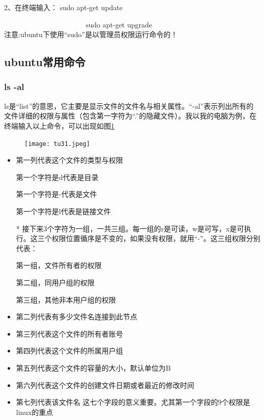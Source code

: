 \documentclass[12pt]{article}
\begin{document}
 2、在终端输入： sudo apt-get update

~~~~~~~~~~~~~~~~~~~~~~~sudo apt-get upgrade\\
{\color{red}注意:}ubuntu下使用{\color{red}“sudo”}是以管理员权限运行命令的！
\subsection{ubuntu常用命令}
\subsubsection{ls -al}
 ls是“list”的意思，它主要是显示文件的文件名与相关属性。“-al”表示列出所有的文件详细的权限与属性（包含第一字符为“.”的隐藏文件）。我以我的电脑为例，在终端输入以上命令，可以出现如图\ref{tu31}
\begin{figure}[!htb] %
\centering
\texttt{[image: tu31.jpeg]}
\caption{}
\label{tu31}
\end{figure} 
\begin{itemize}

\item 第一列代表这个文件的类型与权限

第一个字符是d代表是目录

第一个字符是-代表是文件

第一个字符是l代表是链接文件
\item[*] 接下来3个字符为一组，一共三组。每一组的r是可读，w是可写，x是可执行。这三个权限位置循序是不变的，如果没有权限，就用“-”。这三组权限分别代表：

第一组，文件所有者的权限

第二组，同用户组的权限

第三组，其他非本用户组的权限

\item  第二列代表有多少文件名连接到此节点

\item  第三列代表这个文件的所有者账号

\item  第四列代表这个文件的所属用户组

\item  第五列代表这个文件的容量的大小，默认单位为B

\item  第六列代表这个文件的创建文件日期或者最近的修改时间

\item  第七列代表该文件名
这七个字段的意义重要。尤其第一个字段的9个权限是linux的重点

\end{itemize}
\end{document}
